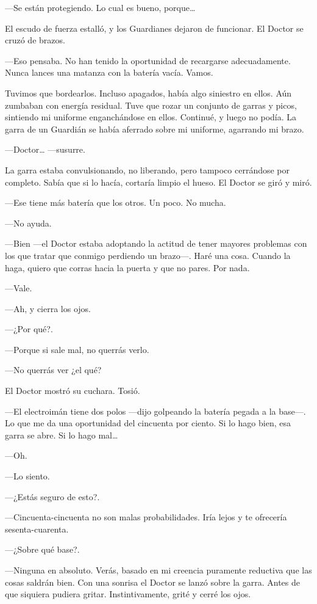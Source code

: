 ---Se están protegiendo. Lo cual es bueno, porque\ldots{}

El escudo de fuerza estalló, y los Guardianes dejaron de funcionar. El
Doctor se cruzó de brazos.

---Eso pensaba. No han tenido la oportunidad de recargarse
adecuadamente. Nunca lances una matanza con la batería vacía. Vamos.

Tuvimos que bordearlos. Incluso apagados, había algo siniestro en ellos.
Aún zumbaban con energía residual. Tuve que rozar un conjunto de garras
y picos, sintiendo mi uniforme enganchándose en ellos. Continué, y luego
no podía. La garra de un Guardián se había aferrado sobre mi uniforme,
agarrando mi brazo.

---Doctor\ldots{} ---susurre.

La garra estaba convulsionando, no liberando, pero tampoco cerrándose
por completo. Sabía que si lo hacía, cortaría limpio el hueso. El Doctor
se giró y miró.

---Ese tiene más batería que los otros. Un poco. No mucha.

---No ayuda.

---Bien ---el Doctor estaba adoptando la actitud de tener mayores
problemas con los que tratar que conmigo perdiendo un brazo---. Haré una
cosa. Cuando la haga, quiero que corras hacia la puerta y que no pares.
Por nada.

---Vale.

---Ah, y cierra los ojos.

---¿Por qué?.

---Porque si sale mal, no querrás verlo.

---No querrás ver ¿el qué?

El Doctor mostró su cuchara. Tosió.

---El electroimán tiene dos polos ---dijo golpeando la batería pegada a
la base---. Lo que me da una oportunidad del cincuenta por ciento. Si lo
hago bien, esa garra se abre. Si lo hago mal\ldots{}

---Oh.

---Lo siento.

---¿Estás seguro de esto?.

---Cincuenta-cincuenta no son malas probabilidades. Iría lejos y te
ofrecería sesenta-cuarenta.

---¿Sobre qué base?.

---Ninguna en absoluto. Verás, basado en mi creencia puramente reductiva
que las cosas saldrán bien. Con una sonrisa el Doctor se lanzó sobre la
garra. Antes de que siquiera pudiera gritar. Instintivamente, grité y
cerré los ojos.

